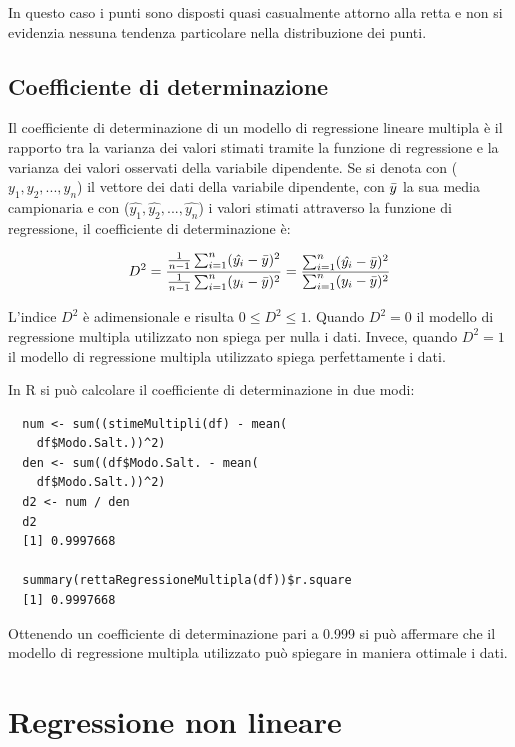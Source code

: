 In questo caso i punti sono disposti quasi casualmente attorno alla retta e non si evidenzia nessuna tendenza particolare nella distribuzione dei punti.

\subsection{Coefficiente di determinazione}\label{cap4.3.2}

Il coefficiente di determinazione di un modello di regressione lineare multipla è il rapporto tra la varianza dei valori stimati tramite la funzione di regressione e la varianza dei valori osservati della variabile dipendente. Se si denota con ($y_1, y_2, ..., y_n$) il vettore dei dati della variabile dipendente, con $\Bar{y}$ la sua media campionaria e con ($\hat{y_1}, \hat{y_2}, ..., \hat{y_n}$) i valori stimati attraverso la funzione di regressione, il coefficiente di determinazione è:

\[D^2 = \frac{\frac{1}{n-1} \sum_{i=1}^n (\hat{y_i} - \Bar{y})^2}{\frac{1}{n-1} \sum_{i=1}^n (y_i - \Bar{y})^2} = \frac{\sum_{i=1}^n (\hat{y_i} - \Bar{y})^2}{\sum_{i=1}^n (y_i - \Bar{y})^2}\] 

L'indice $D^2$ è adimensionale e risulta $0 \leq  D^2 \leq 1$. Quando $D^2 = 0$ il modello di regressione multipla utilizzato non spiega per nulla i dati. Invece, quando $D^2 = 1$ il modello di regressione multipla utilizzato spiega perfettamente i dati.

In R si può calcolare il coefficiente di determinazione in due modi:

\vspace{5mm}
\begin{lstlisting}
  num <- sum((stimeMultipli(df) - mean(
    df$Modo.Salt.))^2)
  den <- sum((df$Modo.Salt. - mean(
    df$Modo.Salt.))^2)
  d2 <- num / den
  d2
  [1] 0.9997668

  summary(rettaRegressioneMultipla(df))$r.square
  [1] 0.9997668
\end{lstlisting}
\vspace{5mm}

Ottenendo un coefficiente di determinazione pari a 0.999 si può affermare che il modello di regressione multipla utilizzato può spiegare in maniera ottimale i dati.

\section{Regressione non lineare}\label{cap4.4}


